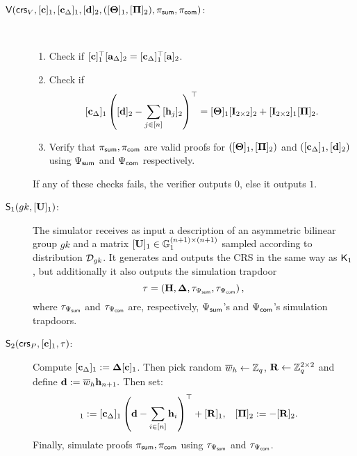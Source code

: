\begin{description}
\item[{$\mathsf{V}(
    \mathsf{crs}_V,
    [\mathbf{c}]_1,
    [\mathbf{c}_{\Delta}]_1, [\mathbf{d}]_2,
    ([\mathbf{{\Theta}}]_1, [\mathbf{{\Pi}}]_2), 
    \pi_{\mathsf{sum}},\pi_{\mathsf{com}})$:}] ~
\begin{enumerate}
\item  Check if $[\mathbf{c}]_1^\top[\mathbf{a}_\Delta]_2 = [\mathbf{c}_\Delta]_1^\top[\mathbf{a}]_2$. 
\item Check if 
\begin{equation}\label{eq:ver1}[\mathbf{c}_{\Delta}]_1
\left(
    [\mathbf{d}]_2-
    \sum_{j \in [n]} [\mathbf{h}_{j}]_2
\right)^{\top} =
    [\mathbf{{\Theta}}]_1[\mathbf{{I}}_{2 \times 2}]_2 +
    [\mathbf{{I}}_{2 \times 2}]_1[\mathbf{{\Pi}}]_2.
    \end{equation}  
  \item Verify that $\pi_{\mathsf{sum}},\pi_{\mathsf{com}}$ are valid proofs for 
  $([\mathbf{{\Theta}}]_1,[\mathbf{{\Pi}}]_2)$
        and $([\mathbf{c}_\Delta]_1,[\mathbf{d}]_2)$ using $\Psi_{\mathsf{sum}}$ and $\Psi_{\mathsf{com}}$ respectively.
\end{enumerate}
If any of these checks fails, the verifier outputs $0$, else it outputs $1$.
\item[{$\mathsf{S}_1({gk},[\mathbf{{U}}]_1)$:}] The simulator receives as input a description of an asymmetric bilinear group ${gk}$ and a matrix $[\mathbf{{U}}]_1 \in \mathbb{G}_1^{(n+1) \times (n+1)}$ sampled according to distribution $\mathcal{D}_{gk}$. It generates and outputs the CRS in the same way as $\mathsf{K}_1$, but additionally it also  outputs the simulation trapdoor 
$$\tau=\left(\mathbf{{H}}, \mathbf{{\Delta}}, \tau_{\Psi_{\mathsf{sum}}}, \tau_{\Psi_{\mathsf{com}}}\right),$$
where $\tau_{\Psi_{\mathsf{sum}}}$ and $\tau_{\Psi_{\mathsf{com}}}$ are, respectively, ${\Psi_{\mathsf{sum}}}$'s and ${\Psi_{\mathsf{com}}}$'s simulation trapdoors.
\item[{$\mathsf{S}_2(\mathsf{crs}_P,[\mathbf{c}]_1,\tau)$:}] Compute $[\mathbf{c}_{\Delta}]_1:=\mathbf{{\Delta}}[\mathbf{c}]_1$.
      Then pick random $\overline{w}_h \gets \mathbb{Z}_q$, $\mathbf{{R}} \gets \mathbb{Z}_q^{2 \times 2}$ and define 
 $\mathbf{d}:= \overline{w}_{h} \mathbf{h}_{n+1}.$
 Then set:
\begin{align*} 
[\matr{\Theta}]_1 & :=  [\vecb{c}_\Delta]_1 \left(\vecb{d}-\sum_{i \in [n]} \lrck_i\right)^\top + [\matr{R}]_1,
    &
    [\matr{\Pi}]_2 & := - [\matr{R}]_2.
\end{align*}
Finally, simulate proofs $\pi_{\mathsf{sum}},\pi_{\mathsf{com}}$ using $\tau_{\Psi_{\mathsf{sum}}}$ and $\tau_{\Psi_{\mathsf{com}}}$.
\end{description}

